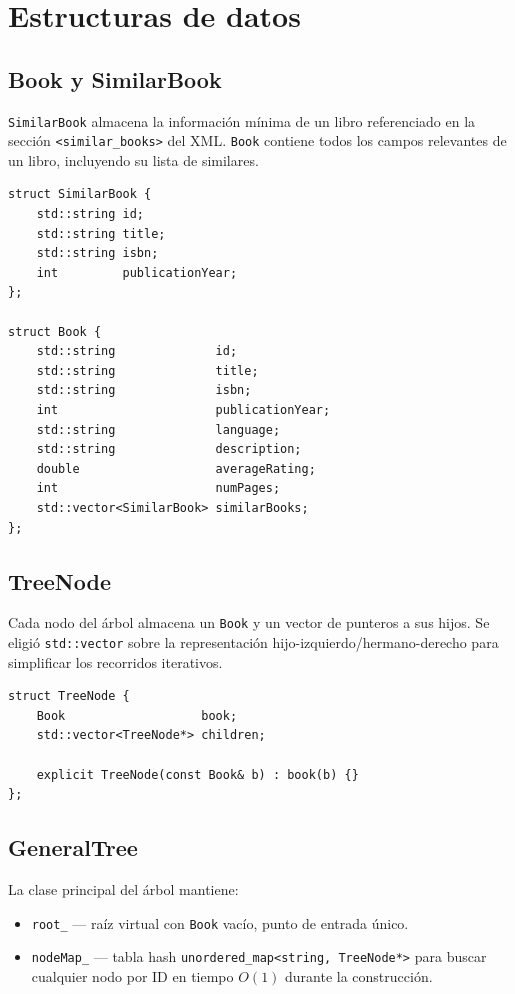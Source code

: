 \documentclass[12pt, a4paper]{article}
\begin{document}
\section{Estructuras de datos}

\subsection{Book y SimilarBook}

\texttt{SimilarBook} almacena la información mínima de un libro referenciado en la
sección \texttt{<similar\_books>} del XML. \texttt{Book} contiene todos los campos
relevantes de un libro, incluyendo su lista de similares.

\begin{lstlisting}
struct SimilarBook {
    std::string id;
    std::string title;
    std::string isbn;
    int         publicationYear;
};

struct Book {
    std::string              id;
    std::string              title;
    std::string              isbn;
    int                      publicationYear;
    std::string              language;
    std::string              description;
    double                   averageRating;
    int                      numPages;
    std::vector<SimilarBook> similarBooks;
};
\end{lstlisting}

\subsection{TreeNode}

Cada nodo del árbol almacena un \texttt{Book} y un vector de punteros a sus hijos.
Se eligió \texttt{std::vector} sobre la representación hijo-izquierdo/hermano-derecho
para simplificar los recorridos iterativos.

\begin{lstlisting}
struct TreeNode {
    Book                   book;
    std::vector<TreeNode*> children;

    explicit TreeNode(const Book& b) : book(b) {}
};
\end{lstlisting}

\subsection{GeneralTree}

La clase principal del árbol mantiene:
\begin{itemize}
    \item \texttt{root\_} — raíz virtual con \texttt{Book} vacío, punto de entrada único.
    \item \texttt{nodeMap\_} — tabla hash \texttt{unordered\_map<string, TreeNode*>} para
          buscar cualquier nodo por ID en tiempo $O(1)$ durante la construcción.
\end{itemize}
\end{document}

